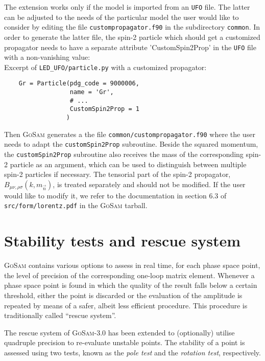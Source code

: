 \documentclass[11pt,a4paper]{refrep}
\newcommand{\gosam}{\textsc{GoSam}\xspace}
\begin{document}
The extension works only if the model is imported from an {\tt UFO} file. 
The latter can  be adjusted to the needs of the particular model the 
user would like to consider by editing the file {\tt custompropagator.f90}
in the subdirectory {\tt common}. 
In order to generate the latter file,
the spin-2 particle which should get a customized propagator needs to have a
separate attribute 'CustomSpin2Prop' in the {\tt UFO} file with a non-vanishing
value:\\
Excerpt of {\tt LED\_UFO/particle.py} with a customized propagator:
\begin{verbatim}
    Gr = Particle(pdg_code = 9000006,
                  name = 'Gr',
                  # ...
                  CustomSpin2Prop = 1
                 )
\end{verbatim}
Then \gosam{} generates a the file {\tt common/custompropagator.f90} where the user needs
to adapt the {\tt customSpin2Prop} subroutine.
Beside the squared momentum, the {\tt customSpin2Prop} subroutine also receives the
mass of the corresponding spin-2 particle as an argument, which
can be used to distinguish between multiple spin-2 particles if necessary.
The tensorial part of the spin-2 propagator, $B_{\mu\nu,\rho\sigma}(k,m_{\vec n})$, is treated separately 
and should not be modified.  If the user would like to modify it, we refer to the  documentation in 
section 6.3 of {\tt src/form/lorentz.pdf} in the \gosam{} tarball.


\chapter{Stability tests and rescue system}
\label{sec:rescue}

\gosam{} contains various options to assess in real time, for each phase space point, 
the level of precision of the corresponding one-loop matrix element. 
Whenever a phase space point is found in which the quality of the result falls below a
certain threshold, either the point is discarded or the evaluation of the amplitude is
repeated by means of a safer, albeit less efficient procedure. This procedure is
traditionally called ``rescue system''.

The rescue system of \gosam-3.0 has been extended to (optionally) utilise quadruple precision to re-evaluate unstable points. The stability of a point is assessed using two tests, known as the \textit{pole test} and the \textit{rotation test}, respectively.
\end{document}

